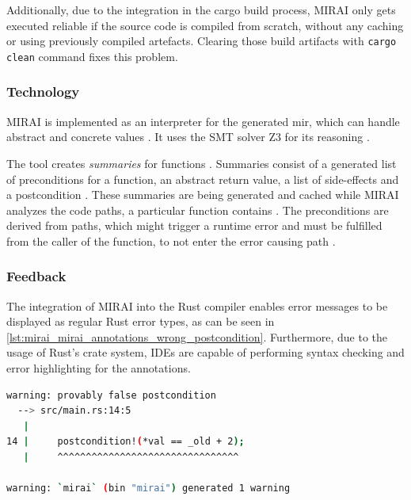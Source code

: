Additionally, due to the integration in the cargo build process, MIRAI only gets executed reliable if the source code is compiled from scratch, without any caching or using previously compiled artefacts. Clearing those build artifacts with \lstinline{cargo clean} command fixes this problem.

\subsubsection{Technology}

MIRAI is implemented as an interpreter for the generated \acs{mir}, which can handle abstract and concrete values \cite{facebookexperimental_miraidocumentationoverviewmd_2021}. It uses the SMT solver Z3 for its reasoning \cite{facebookexperimental_miraidocumentationtaganalysismd_2021}. 

The tool creates \textit{summaries} for functions \cite{facebookexperimental_miraidocumentationoverviewmd_2021}. Summaries consist of a generated list of preconditions for a function, an abstract return value, a list of side-effects and a postcondition \cite{facebookexperimental_miraidocumentationoverviewmd_2021}. These summaries are being generated and cached while MIRAI analyzes the code paths, a particular function contains \cite{facebookexperimental_miraidocumentationoverviewmd_2021}. The preconditions are derived from paths, which might trigger a runtime error and must be fulfilled from the caller of the function, to not enter the error causing path \cite{facebookexperimental_miraidocumentationoverviewmd_2021}.

\subsubsection{Feedback}

The integration of MIRAI into the Rust compiler enables error messages to be displayed as regular Rust error types, as can be seen in \autoref{lst:mirai_mirai_annotations_wrong_postcondition}. Furthermore, due to the usage of Rust's crate system, IDEs are capable of performing syntax checking and error highlighting for the annotations.

\begin{lstlisting}[float, language=bash, caption= Example output of a verification error in MIRAI with the mirai-annotations crate, label={lst:mirai_mirai_annotations_wrong_postcondition}]
warning: provably false postcondition
  --> src/main.rs:14:5
   |
14 |     postcondition!(*val == _old + 2);
   |     ^^^^^^^^^^^^^^^^^^^^^^^^^^^^^^^^

warning: `mirai` (bin "mirai") generated 1 warning
\end{lstlisting}

